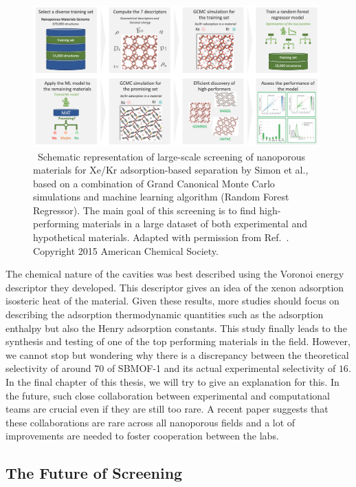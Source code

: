 \documentclass[main.tex]{subfiles}
\begin{document}
\begin{figure}[t]
    \centering
    \includegraphics[width=0.98\textwidth]{figures/1-screening/Simon.jpg}
    \caption{\ Schematic representation of large-scale screening of nanoporous materials for Xe/Kr adsorption-based separation by Simon et al.,\cite{Simon_2015} based on a combination of Grand Canonical Monte Carlo simulations and machine learning algorithm (Random Forest Regressor). The main goal of this screening is to find high-performing materials in a large dataset of both experimental and hypothetical materials. 
    Adapted with permission from Ref.~. Copyright 2015 American Chemical Society.
    }\label{fgr:Simon}
\end{figure}

The chemical nature of the cavities was best described using the Voronoi energy descriptor they developed. This descriptor gives an idea of the xenon adsorption isosteric heat of the material. Given these results, more studies should focus on describing the adsorption thermodynamic quantities such as the adsorption enthalpy but also the Henry adsorption constants. This study finally leads to the synthesis and testing of one of the top performing materials in the field. However, we cannot stop but wondering why there is a discrepancy between the theoretical selectivity of around $70$ of SBMOF-1 and its actual experimental selectivity of $16$. In the final chapter of this thesis, we will try to give an explanation for this. In the future, such close collaboration between experimental and computational teams are crucial even if they are still too rare. A recent paper suggests that these collaborations are rare across all nanoporous fields and a lot of improvements are needed to foster cooperation between the labs.\cite{Li_2022}


\subsection{The Future of Screening}
\end{document}
